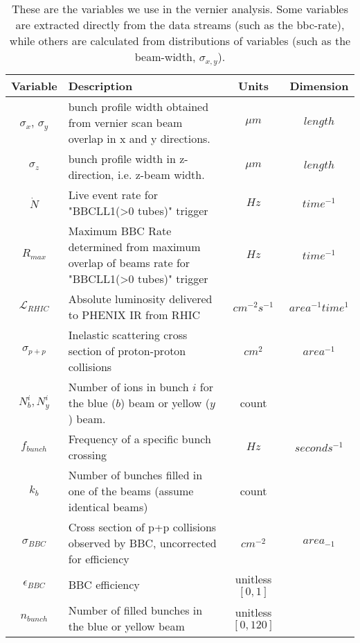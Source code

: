 \begin{table}[ht]
\centering
\begin{tabular}{c p{8cm} c c }
\toprule
\textbf{Variable} & \textbf{Description} & \textbf{Units} & \textbf{Dimension} \\
\midrule 
$\sigma_{x}$, $\sigma_{y}$ & bunch profile width obtained from vernier scan beam overlap in x and y directions. & $\mu m$ & $length$ \\
$\sigma_{z}$ & bunch profile width in z-direction, i.e. z-beam width. & $\mu m$ & $length$ \\
$\dot{N}$ & Live event rate for "BBCLL1(\textgreater0 tubes)" trigger & $Hz$ & $time^{-1}$ \\
$R_{max}$ & Maximum BBC Rate determined from maximum overlap of beams rate for "BBCLL1(\textgreater0 tubes)" trigger & $Hz$ & $time^{-1}$ \\
$\mathcal{L}_{RHIC}$ & Absolute luminosity delivered to PHENIX IR from RHIC & $cm^{-2}s^{-1}$ & $area^{-1}time^{1}$ \\
$\sigma_{p+p} $ & Inelastic scattering cross section of proton-proton collisions & $cm^{2}$ & $area^{-1}$ \\
$N_{b}^{i},N_{y}^{i}$ & Number of ions in bunch $i$ for the blue ($b$) beam or yellow ($y$) beam. & count & \\
$f_{bunch}$ & Frequency of a specific bunch crossing & $Hz$ & $seconds^{-1}$ \\
$k_{b}$ & Number of bunches filled in one of the beams (assume identical beams) & count & \\
$\sigma_{BBC}$ & Cross section of p+p collisions observed by BBC, uncorrected for efficiency & $cm^{-2}$ & $area_{-1}$ \\
$\epsilon_{BBC}$ & BBC efficiency & unitless $[0,1]$ & \\
$n_{bunch}$ & Number of filled bunches in the blue or yellow beam & unitless $[0,120]$ & \\
\bottomrule
\end{tabular}
\caption{These are the variables we use in the vernier analysis. Some variables are
extracted directly from the data streams (such as the bbc-rate), while others are
calculated from distributions of variables (such as the beam-width, $\sigma_{x,y}$). }
\label{tab:ana_vars}
\end{table}
